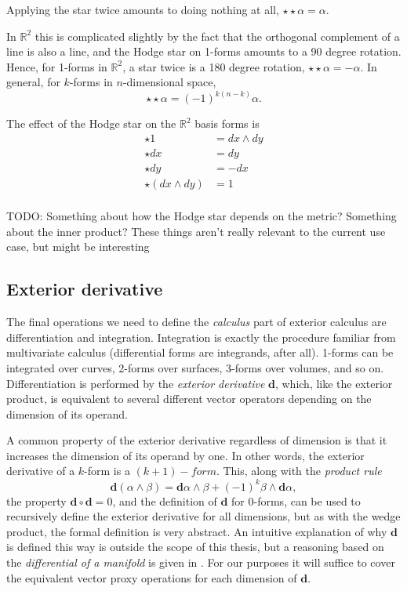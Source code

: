 \documentclass[utf8,english]{gradu3}
\begin{document}
Applying the star twice amounts to doing nothing at all,
$\star\star\alpha = \alpha$.

In $\mathbb{R}^2$ this is complicated slightly by the fact that
the orthogonal complement of a line is also a line,
and the Hodge star on 1-forms amounts to a 90 degree rotation.
Hence, for 1-forms in $\mathbb{R}^2$, a star twice is a 180 degree rotation,
$\star\star\alpha = -\alpha$.
In general, for $k$-forms in $n$-dimensional space,
\[
  \star\star\alpha = (-1)^{k(n-k)}\alpha.
\]

The effect of the Hodge star on the $\mathbb{R}^2$ basis forms is
\begin{align*}
  \star 1 &= dx \wedge dy \\
  \star dx &= dy \\
  \star dy &= -dx \\
  \star (dx \wedge dy) &= 1 \\
\end{align*}

TODO: Something about how
the Hodge star depends on the metric?
Something about the inner product?
These things aren't really relevant to the current use case,
but might be interesting

\subsection{Exterior derivative}\label{sec:ext_der}

The final operations we need to define the \textit{calculus} part of exterior calculus
are differentiation and integration.
Integration is exactly the procedure familiar from multivariate calculus
(differential forms are integrands, after all).
1-forms can be integrated over curves, 2-forms over surfaces,
3-forms over volumes, and so on.
Differentiation is performed by the \textit{exterior derivative} $\mathbf{d}$,
which, like the exterior product,
is equivalent to several different vector operators
depending on the dimension of its operand.

A common property of the exterior derivative regardless of dimension
is that it increases the dimension of its operand by one.
In other words, the exterior derivative of a $k$-form is a $(k+1)-form$.
This, along with the \textit{product rule}
\[
  \mathbf{d}(\alpha \wedge \beta)
  = \mathbf{d}\alpha \wedge \beta + (-1)^k \beta \wedge \mathbf{d}\alpha,
\]
the property $\mathbf{d} \circ \mathbf{d} = 0$,
and the definition of $\mathbf{d}$ for 0-forms,
can be used to recursively define the exterior derivative for all dimensions,
but as with the wedge product, the formal definition is very abstract.
An intuitive explanation of why $\mathbf{d}$ is defined this way
is outside the scope of this thesis,
but a reasoning based on the \textit{differential of a manifold}
is given in \cite{crane_digital_2013}.
For our purposes it will suffice to cover the equivalent vector proxy operations
for each dimension of $\mathbf{d}$.
\end{document}
